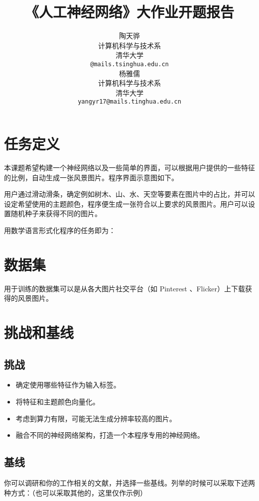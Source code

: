 \documentclass{article}
\title{《人工神经网络》大作业开题报告}
\author{
  陶天骅\\
  计算机科学与技术系 \\
  清华大学 \\
  \texttt{@mails.tsinghua.edu.cn} \\
  \AND
  杨雅儒\\
  计算机科学与技术系 \\
  清华大学 \\
  \texttt{yangyr17@mails.tinghua.edu.cn} \\
}
\begin{document}

\maketitle




\section{任务定义}

本课题希望构建一个神经网络以及一些简单的界面，可以根据用户提供的一些特征的比例，自动生成一张风景图片。程序界面示意图如下。

用户通过滑动滑条，确定例如树木、山、水、天空等要素在图片中的占比，并可以设定希望使用的主题颜色，程序便生成一张符合以上要求的风景图片。用户可以设置随机种子来获得不同的图片。

用数学语言形式化程序的任务即为：

\section{数据集}

用于训练的数据集可以是从各大图片社交平台（如 Pinterest 、Flicker）上下载获得的风景图片。

\section{挑战和基线}

\subsection{挑战}
\begin{itemize}
	\item 确定使用哪些特征作为输入标签。
	\item 将特征和主题颜色向量化。
	\item 考虑到算力有限，可能无法生成分辨率较高的图片。
	\item 融合不同的神经网络架构，打造一个本程序专用的神经网络。
\end{itemize}

\subsection{基线}

你可以调研和你的工作相关的文献，并选择一些基线。列举的时候可以采取下述两种方式：（也可以采取其他的，这里仅作示例）
\end{document}
